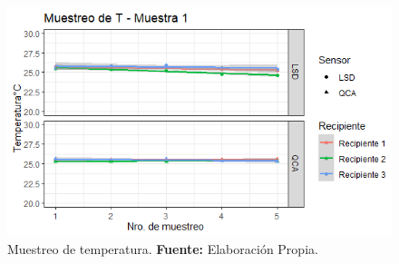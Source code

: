     \begin{figure}[H]
        \centering
        \includegraphics[width=0.75\linewidth]{Imagenes/cap4/T_M1.png}
        \caption {Muestreo de temperatura. \textbf{Fuente:}
        Elaboraci\'on Propia. }
        \label{fig:M1T}
    \end{figure}
    
